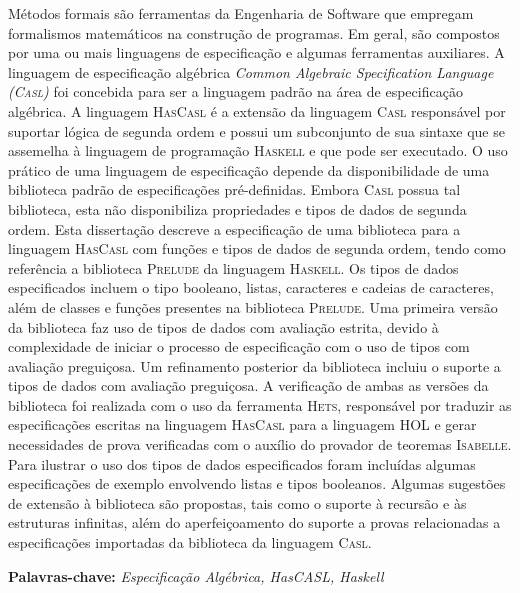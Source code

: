 \documentclass[12pt,twoside]{report} %
\newcommand{\HasCASL}{\textsc{HasCasl}\xspace}
\newcommand{\CASL}{\textsc{Casl}\xspace}
\newcommand{\Hets}{\textsc{Hets}\xspace}
\newcommand{\Haskell}{\textsc{Haskell}\xspace}
\newcommand{\HOL}{\textsc{HOL}\xspace}
\newcommand{\Isabelle}{\textsc{Isabelle}\xspace}
\newcommand{\Prelude}{\textsc{Prelude}\xspace}
\begin{document}
\beforepreface
{}
Métodos formais são ferramentas da Engenharia de Software que empregam formalismos matemáticos na construção de programas.
Em geral, são compostos por uma ou mais linguagens de especiﬁcação e algumas ferramentas auxiliares.
A linguagem de especiﬁcação algébrica \textit{Common Algebraic Speciﬁcation Language (\CASL)} foi concebida para ser a linguagem padrão na área de especiﬁcação algébrica.
A linguagem \HasCASL é a extensão da linguagem \CASL responsável por suportar lógica de segunda ordem e possui um subconjunto de sua sintaxe que se assemelha à linguagem de programação \Haskell e que pode ser executado.
O uso prático de uma linguagem de especiﬁcação depende da disponibilidade de uma biblioteca padrão de especiﬁcações pré-deﬁnidas.
Embora \CASL possua tal biblioteca, esta não disponibiliza propriedades e tipos de dados de segunda ordem.
Esta dissertação descreve a especiﬁcação de uma biblioteca para a linguagem \HasCASL com funções e tipos de dados de segunda ordem, tendo como referência a biblioteca \Prelude da linguagem \Haskell.
Os tipos de dados especificados incluem o tipo booleano, listas, caracteres e cadeias de caracteres, além de classes e funções presentes na biblioteca \Prelude.
Uma primeira versão da biblioteca faz uso de tipos de dados com avaliação estrita, devido à complexidade de iniciar o processo de especificação com o uso de tipos com avaliação preguiçosa.
Um refinamento posterior da biblioteca incluiu o suporte a tipos de dados com avaliação preguiçosa.
A veriﬁcação de ambas as versões da biblioteca foi realizada com o uso da ferramenta \Hets, responsável por traduzir as especiﬁcações escritas na linguagem \HasCASL para a linguagem \HOL e gerar necessidades de prova veriﬁcadas com o auxílio do provador de teoremas \Isabelle.
Para ilustrar o uso dos tipos de dados especificados foram incluídas algumas especiﬁcações de exemplo envolvendo listas e tipos booleanos.
Algumas sugestões de extensão à biblioteca são propostas, tais como o suporte à recursão e às estruturas infinitas, além do aperfeiçoamento do suporte a provas relacionadas a especificações importadas da biblioteca da linguagem \CASL.

\textbf{Palavras-chave:} \textit{Especificação Algébrica, HasCASL, Haskell}
\end{document}
